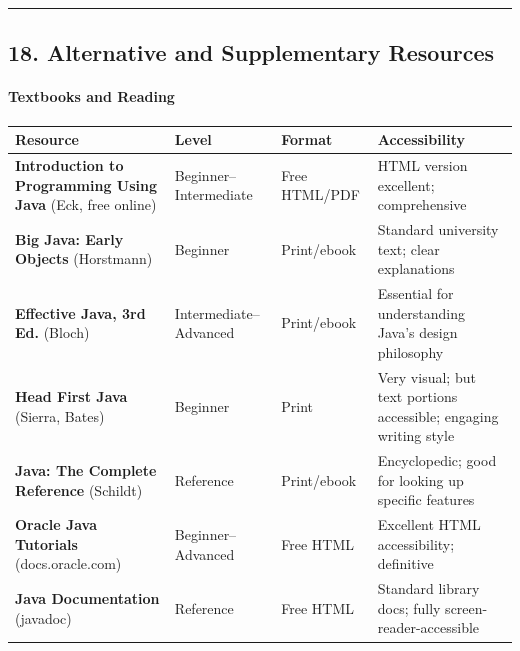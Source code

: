 \documentclass[
  justified,
  openright,
]{tufte-book}
\let\subsubsection\paragraph
\let\paragraph\paragraph
\let\subsubsection\paragraph
\let\paragraph\paragraph
\begin{document}
\begin{center}\rule{0.5\linewidth}{0.5pt}\end{center}

\subsection{18. Alternative and Supplementary
Resources}\label{alternative-and-supplementary-resources}

\subsubsection{Textbooks and Reading}\label{textbooks-and-reading}

{\def\LTcaptype{none} %
\begin{longtable}[]{@{}
  >{\raggedright\arraybackslash}p{}
  >{\raggedright\arraybackslash}p{}
  >{\raggedright\arraybackslash}p{}
  >{\raggedright\arraybackslash}p{}@{}}
\toprule\noalign{}
\begin{minipage}[b]{\linewidth}\raggedright
Resource
\end{minipage} & \begin{minipage}[b]{\linewidth}\raggedright
Level
\end{minipage} & \begin{minipage}[b]{\linewidth}\raggedright
Format
\end{minipage} & \begin{minipage}[b]{\linewidth}\raggedright
Accessibility
\end{minipage} \\
\midrule\noalign{}
\endhead
\bottomrule\noalign{}
\endlastfoot
\textbf{Introduction to Programming Using Java} (Eck, free online) &
Beginner--Intermediate & Free HTML/PDF & HTML version excellent;
comprehensive \\
\textbf{Big Java: Early Objects} (Horstmann) & Beginner & Print/ebook &
Standard university text; clear explanations \\
\textbf{Effective Java, 3rd Ed.} (Bloch) & Intermediate--Advanced &
Print/ebook & Essential for understanding Java's design philosophy \\
\textbf{Head First Java} (Sierra, Bates) & Beginner & Print & Very
visual; but text portions accessible; engaging writing style \\
\textbf{Java: The Complete Reference} (Schildt) & Reference &
Print/ebook & Encyclopedic; good for looking up specific features \\
\textbf{Oracle Java Tutorials} (docs.oracle.com) & Beginner--Advanced &
Free HTML & Excellent HTML accessibility; definitive \\
\textbf{Java Documentation} (javadoc) & Reference & Free HTML & Standard
library docs; fully screen-reader-accessible \\
\end{longtable}
}
\end{document}
